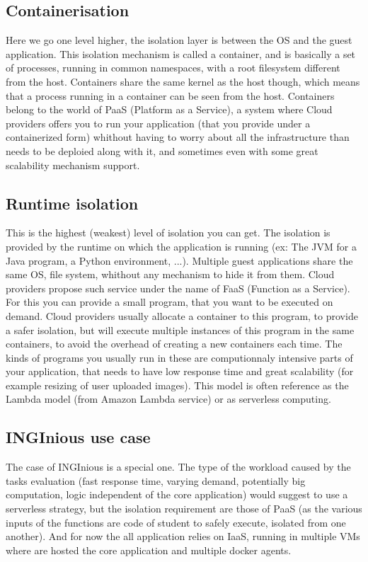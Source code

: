 \subsection{Containerisation}
Here we go one level higher, the isolation layer is between the OS and the guest application.  This isolation mechanism is called a container, and is basically a set of processes, running in common namespaces, with a root filesystem different from the host.  Containers share the same kernel as the host though, which means that a process running in a container can be seen from the host.  Containers belong to the world of PaaS (Platform as a Service), a system where Cloud providers offers you to run your application (that you provide under a containerized form) whithout having to worry about all the infrastructure than needs to be deploied along with it, and sometimes even with some great scalability mechanism support.
\subsection{Runtime isolation}
This is the highest (weakest) level of isolation you can get.  The isolation is provided by the runtime on which the application is running (ex: The JVM for a Java program, a Python environment, ...).  Multiple guest applications share the same OS, file system, whithout any mechanism to hide it from them.  Cloud providers propose such service under the name of FaaS (Function as a Service).  For this you can provide a small program, that you want to be executed on demand.  Cloud providers usually allocate a container to this program, to provide a safer isolation, but will execute multiple instances of this program in the same containers, to avoid the overhead of creating a new containers each time.  The kinds of programs you usually run in these are computionnaly intensive parts of your application, that needs to have low response time and great scalability (for example resizing of user uploaded images).  This model is often reference as the Lambda model (from Amazon Lambda service) or as serverless computing.

\subsection{INGInious use case}
The case of INGInious is a special one.  The type of the workload caused by the tasks evaluation (fast response time, varying demand, potentially big computation, logic independent of the core application) would suggest to use a serverless strategy, but the isolation requirement are those of PaaS (as the various inputs of the functions are code of student to safely execute, isolated from one another).  And for now the all application relies on IaaS, running in multiple VMs where are hosted the core application and multiple docker agents.  

